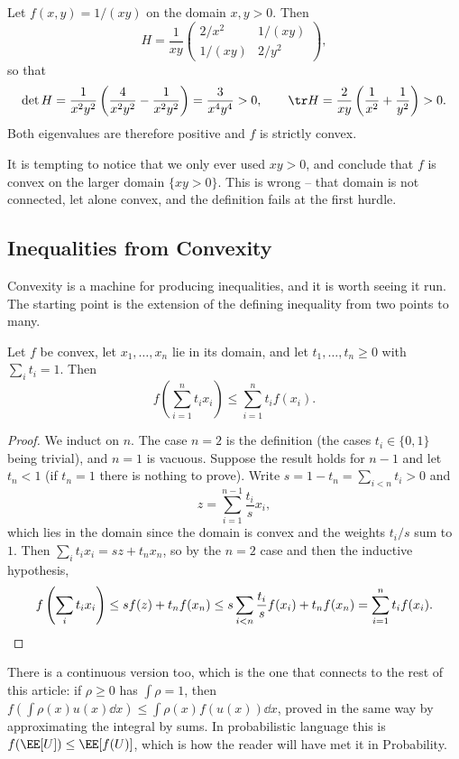 \documentclass[a4paper]{scrartcl}
\begin{document}
\begin{example}
	Let $f(x, y) = 1/(xy)$ on the domain $x, y > 0$. Then
	$$
	H = \frac{1}{xy}\begin{pmatrix}
		2/x^2 & 1/(xy) \\ 1/(xy) & 2/y^2
	\end{pmatrix},
	$$
	so that
	$$
	\det H = \frac{1}{x^2y^2}\left(\frac{4}{x^2y^2} - \frac{1}{x^2y^2}\right) = \frac{3}{x^4 y^4} > 0, \qquad \tr H = \frac{2}{xy}\left(\frac{1}{x^2} + \frac{1}{y^2}\right) > 0.
	$$
	Both eigenvalues are therefore positive and $f$ is strictly convex.

	It is tempting to notice that we only ever used $xy > 0$, and conclude that $f$ is convex on the larger domain $\{xy > 0\}$. This is wrong -- that domain is not connected, let alone convex, and the definition fails at the first hurdle.
\end{example}

\subsection{Inequalities from Convexity}

Convexity is a machine for producing inequalities, and it is worth seeing it run. The starting point is the extension of the defining inequality from two points to many.

\begin{theorem}
	Let $f$ be convex, let $x_1, \dots, x_n$ lie in its domain, and let $t_1, \dots, t_n \geq 0$ with $\sum_i t_i = 1$. Then
	$$
	f\left(\sum_{i=1}^n t_i x_i\right) \leq \sum_{i = 1}^n t_i f(x_i).
	$$
\end{theorem}
\begin{proof}
	We induct on $n$. The case $n = 2$ is the definition (the cases $t_i \in \{0,1\}$ being trivial), and $n = 1$ is vacuous. Suppose the result holds for $n - 1$ and let $t_n < 1$ (if $t_n = 1$ there is nothing to prove). Write $s = 1 - t_n = \sum_{i < n} t_i > 0$ and
	$$
	z = \sum_{i = 1}^{n-1}\frac{t_i}{s}x_i,
	$$
	which lies in the domain since the domain is convex and the weights $t_i/s$ sum to $1$. Then $\sum_i t_i x_i = sz + t_n x_n$, so by the $n = 2$ case and then the inductive hypothesis,
	\[
	f\left(\sum_i t_i x_i\right) \leq s f(z) + t_n f(x_n) \leq s \sum_{i<n} \frac{t_i}{s}f(x_i) + t_n f(x_n) = \sum_{i=1}^n t_i f(x_i). \qedhere
	\]
\end{proof}

There is a continuous version too, which is the one that connects to the rest of this article: if $\rho \geq 0$ has $\int \rho = 1$, then $f\left(\int \rho(x) u(x) \dd x\right) \leq \int \rho(x) f(u(x)) \dd x$, proved in the same way by approximating the integral by sums. In probabilistic language this is $f(\EE[U]) \leq \EE[f(U)]$, which is how the reader will have met it in Probability.
\end{document}
